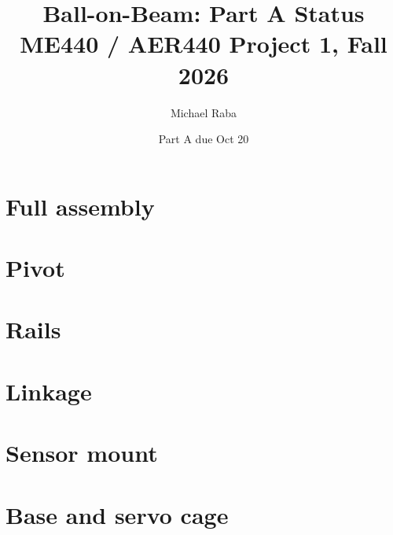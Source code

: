 \documentclass[11pt]{article}
\author{Michael Raba}
\date{Part A due Oct 20}
\title{Ball-on-Beam: Part A Status\\\medskip
\large ME440 / AER440 Project 1, Fall 2026}
\begin{document}
\maketitle
\section*{Full assembly}
\label{sec:org984865a}
\section*{Pivot}
\label{sec:orgc041a46}
\section*{Rails}
\label{sec:org9c209db}
\section*{Linkage}
\label{sec:org5c0bd3a}
\section*{Sensor mount}
\label{sec:org24e4abd}
\section*{Base and servo cage}
\label{sec:org450096f}
\end{document}
